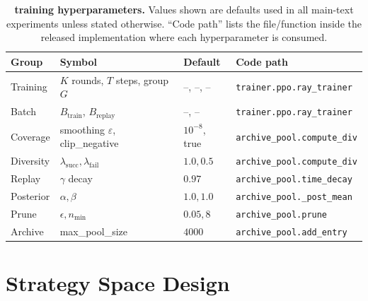 \begin{table}[h]
  \centering
  \small
  \caption{\textbf{\method training hyperparameters.} Values shown are defaults used in all main-text experiments unless stated otherwise. ``Code path'' lists the file/function inside the released implementation where each hyperparameter is consumed.}
  \label{tab:hyperparams}
  \setlength{\tabcolsep}{4pt}
  \begin{tabular}{llll}
    \toprule
    \textbf{Group} & \textbf{Symbol} & \textbf{Default} & \textbf{Code path} \\
    \midrule
    Training       & $K$ rounds, $T$ steps, group $G$ & --, --, -- & \texttt{trainer.ppo.ray\_trainer} \\
    Batch          & $B_{\mathrm{train}}$, $B_{\mathrm{replay}}$ & --, -- & \texttt{trainer.ppo.ray\_trainer} \\
    Coverage       & smoothing $\varepsilon$, clip\_negative & $10^{-8}$, true & \texttt{archive\_pool.compute\_div} \\
    Diversity      & $\lambda_{\mathrm{succ}}, \lambda_{\mathrm{fail}}$ & $1.0, 0.5$ & \texttt{archive\_pool.compute\_div} \\
    Replay         & $\gamma$ decay & $0.97$ & \texttt{archive\_pool.time\_decay} \\
    Posterior      & $\alpha, \beta$ & $1.0, 1.0$ & \texttt{archive\_pool.\_post\_mean} \\
    Prune          & $\epsilon, n_{\min}$ & $0.05, 8$ & \texttt{archive\_pool.prune} \\
    Archive        & max\_pool\_size & $4000$ & \texttt{archive\_pool.add\_entry} \\
    \bottomrule
  \end{tabular}
\end{table}

\section{Strategy Space Design}
\label{apdx:space-design}

